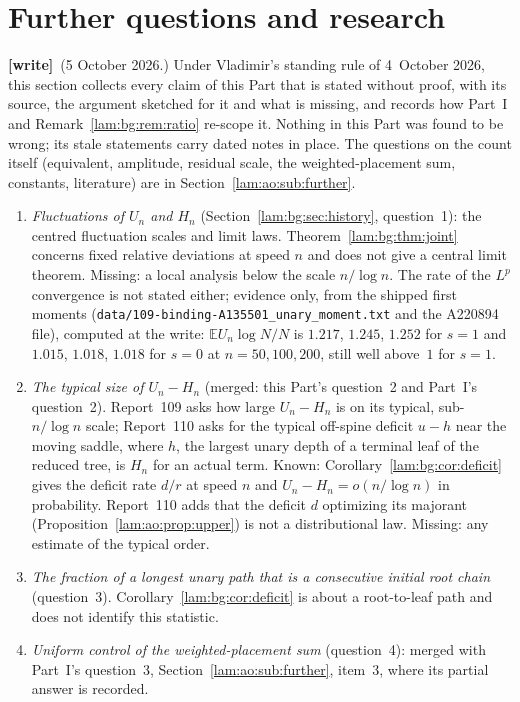 \documentclass[11pt,a4paper]{article}
\numberwithin{equation}{section}
\theoremstyle{remark}
\newcommand{\E}{\mathbb E}
\newcommand{\file}[1]{\nolinkurl{#1}}
\newcommand{\wtag}{\textup{\textbf{[write]}}}
\begin{document}
\section{Further questions and research}\label{lam:bg:sec:further}
\wtag\ (5 October 2026.) Under Vladimir's standing rule of 4~October 2026, this section collects every claim of this Part that is stated without proof, with its source, the argument sketched for it and what is missing, and records how Part~I and Remark~\ref{lam:bg:rem:ratio} re-scope it. Nothing in this Part was found to be wrong; its stale statements carry dated notes in place. The questions on the count itself (equivalent, amplitude, residual scale, the weighted-placement sum, constants, literature) are in Section~\ref{lam:ao:sub:further}.
\begin{enumerate}
\item \emph{Fluctuations of $U_n$ and $H_n$} (Section~\ref{lam:bg:sec:history}, question~1): the centred fluctuation scales and limit laws. Theorem~\ref{lam:bg:thm:joint} concerns fixed relative deviations at speed $n$ and does not give a central limit theorem. Missing: a local analysis below the scale $n/\log n$. The rate of the $L^p$ convergence is not stated either; evidence only, from the shipped first moments (\file{data/109-binding-A135501_unary_moment.txt} and the A220894 file), computed at the write: $\E U_n\log N/N$ is $1.217$, $1.245$, $1.252$ for $s=1$ and $1.015$, $1.018$, $1.018$ for $s=0$ at $n=50,100,200$, still well above~$1$ for $s=1$.
\item \emph{The typical size of $U_n-H_n$} (merged: this Part's question~2 and Part~I's question~2). Report~109 asks how large $U_n-H_n$ is on its typical, sub-$n/\log n$ scale; Report~110 asks for the typical off-spine deficit $u-h$ near the moving saddle, where $h$, the largest unary depth of a terminal leaf of the reduced tree, is $H_n$ for an actual term. Known: Corollary~\ref{lam:bg:cor:deficit} gives the deficit rate $d/r$ at speed $n$ and $U_n-H_n=o(n/\log n)$ in probability. Report~110 adds that the deficit $d$ optimizing its majorant (Proposition~\ref{lam:ao:prop:upper}) is not a distributional law. Missing: any estimate of the typical order.
\item \emph{The fraction of a longest unary path that is a consecutive initial root chain} (question~3). Corollary~\ref{lam:bg:cor:deficit} is about a root-to-leaf path and does not identify this statistic.
\item \emph{Uniform control of the weighted-placement sum} (question~4): merged with Part~I's question~3, Section~\ref{lam:ao:sub:further}, item~3, where its partial answer is recorded.

\end{enumerate}
\end{document}
